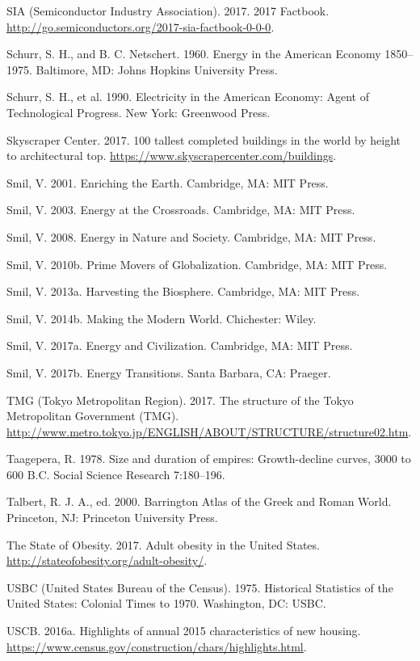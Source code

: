 SIA (Semiconductor Industry Association). 2017. 2017 Factbook. \url{http://go.semiconductors.org/2017-sia-factbook-0-0-0}.\par
Schurr, S. H., and B. C. Netschert. 1960. Energy in the American Economy 1850–1975. Baltimore, MD: Johns Hopkins University Press.\par
Schurr, S. H., et al. 1990. Electricity in the American Economy: Agent of Technological Progress. New York: Greenwood Press.\par
Skyscraper Center. 2017. 100 tallest completed buildings in the world by height to architectural top. \url{https://www.skyscrapercenter.com/buildings}.\par
Smil, V. 2001. Enriching the Earth. Cambridge, MA: MIT Press.\par
Smil, V. 2003. Energy at the Crossroads. Cambridge, MA: MIT Press.\par
Smil, V. 2008. Energy in Nature and Society. Cambridge, MA: MIT Press.\par
Smil, V. 2010b. Prime Movers of Globalization. Cambridge, MA: MIT Press.\par
Smil, V. 2013a. Harvesting the Biosphere. Cambridge, MA: MIT Press.\par
Smil, V. 2014b. Making the Modern World. Chichester: Wiley.\par
Smil, V. 2017a. Energy and Civilization. Cambridge, MA: MIT Press.\par
Smil, V. 2017b. Energy Transitions. Santa Barbara, CA: Praeger.\par
TMG (Tokyo Metropolitan Region). 2017. The structure of the Tokyo Metropolitan Government (TMG). \url{http://www.metro.tokyo.jp/ENGLISH/ABOUT/STRUCTURE/structure02.htm}.\par
Taagepera, R. 1978. Size and duration of empires: Growth-decline curves, 3000 to 600 B.C. Social Science Research 7:180–196.\par
Talbert, R. J. A., ed. 2000. Barrington Atlas of the Greek and Roman World. Princeton, NJ: Princeton University Press.\par
The State of Obesity. 2017. Adult obesity in the United States. \url{http://stateofobesity.org/adult-obesity/}.\par
USBC (United States Bureau of the Census). 1975. Historical Statistics of the United States: Colonial Times to 1970. Washington, DC: USBC.\par
USCB. 2016a. Highlights of annual 2015 characteristics of new housing. \url{https://www.census.gov/construction/chars/highlights.html}.\par
